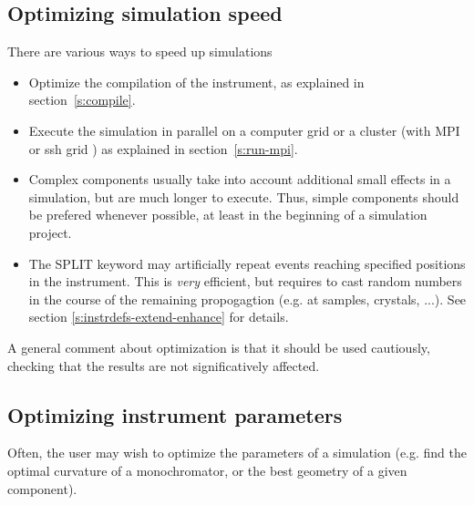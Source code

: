 \subsection{Optimizing simulation speed}
\label{s:optim}
There are various ways to speed up simulations
\begin{itemize}
\item Optimize the compilation of the instrument, as explained in section~\ref{s:compile}.
\item Execute the simulation in parallel on a computer grid or a cluster (with MPI or ssh grid
) as explained in section~\ref{s:run-mpi}.
\item Complex components usually take into account additional small effects in a simulation,
      but are much longer to execute. Thus, simple components should be prefered
      whenever possible, at least in the beginning of a simulation project.
\item The SPLIT keyword may artificially repeat events reaching specified positions in the
      instrument. This is \emph{very} efficient, but requires to cast random numbers in the course of
      the remaining propogagtion (e.g. at samples, crystals, ...). See section \ref{s:instrdefs-extend-enhance} for details.
\end{itemize}
A general comment about optimization is that it should be used cautiously, checking that the results are not significatively affected.

\subsection{Optimizing instrument parameters}
\label{s:optimize}
Often, the user may wish to optimize the parameters of a simulation (e.g. find the optimal curvature of a monochromator, or the best geometry of a given component).

